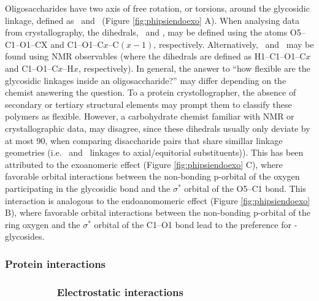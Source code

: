 \documentclass[journal=jctcce,manuscript=article]{achemso}
\begin{document}
{Oligosaccharides have two axis of free rotation, or torsions, around the glycosidic linkage, defined as \textphi~and \textpsi~(Figure \ref{fig:phipsiendoexo} A). When analysing data from crystallography, the dihedrals, \textphi~and \textpsi, may be defined using the atoms O5--C1--O1--CX and C1--O1--C$x$--C$(x-1)$, respectively. \cite{Nivedha2016Vina-Carb:Docking, Lutteke2005CarbohydratePDB.}
Alternatively, \textphi~and \textpsi~may be found using NMR observables (where the dihedrals are defined as H1--C1--O1--C$x$ and C1--O1--C$x$--H$x$, respectively). \cite{Hricovini2015SolutionAnalysis., Nivedha2016Vina-Carb:Docking, Pol-Fachin2008DepictionSolutions}
In general, the answer to ``how flexible are the glycosidic linkages inside an oligosaccharide?'' may differ depending on the chemist answering the question. 
To a protein crystollographer, the absence of secondary or tertiary structural elements may prompt them to classify these polymers as flexible. \cite{Woods1998TheMolecule}
However, a carbohydrate chemist familiar with NMR or crystallographic data, may disagree, since these dihedrals usually only deviate by at most 90\textdegree, when comparing disaccharide pairs that share simillar linkage geometries (i.e. \textalpha~and \textbeta~linkages to axial/equitorial substituents)).\cite{Clerc2018ASpace, Hricovini2015SolutionAnalysis}
This has been attributed to the exoanomeric effect (Figure \ref{fig:phipsiendoexo} C), where favorable orbital interactions between the non-bonding p-orbital of the oxygen participating in the glycosidic bond and the $\sigma^{*}$ orbital of the O5--C1 bond. \cite{Woods2018PredictingComplexes}
This interaction is analogous to the endoanomomeric effect (Figure \ref{fig:phipsiendoexo} B), where favorable orbital interactions between the non-bonding p-orbital of the ring oxygen and the $\sigma^{*}$ orbital of the C1--O1 bond lead to the preference for \textalpha-glycosides. \cite{Varki2009BiologicalGlycans}

\subsubsection{Protein interactions}

\subsubsection*{~~~~~~~~~Electrostatic interactions}


}
\end{document}

